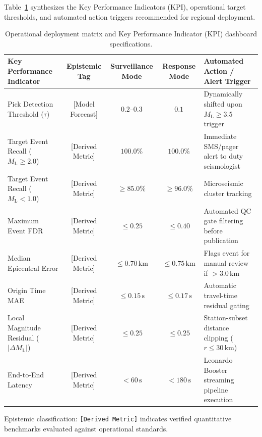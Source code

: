 Table~\ref{tab:operational_kpi_matrix} synthesizes the Key Performance Indicators (\ac{KPI}), operational target thresholds, and automated action triggers recommended for regional deployment.

\begin{table}[htbp]
  \centering
  \small
  \caption{Operational deployment matrix and Key Performance Indicator (KPI) dashboard specifications.}
  \label{tab:operational_kpi_matrix}
  \begin{threeparttable}
    \begin{tabularx}{\linewidth}{l c c c X}
      \toprule
      \textbf{Key Performance Indicator} & \textbf{Epistemic Tag\tnote{a}} & \textbf{Surveillance Mode} & \textbf{Response Mode} & \textbf{Automated Action / Alert Trigger} \\
      \midrule
      Pick Detection Threshold ($\tau$) & [Model Forecast] & $0.2\text{--}0.3$ & $0.1$ & Dynamically shifted upon $M_{\mathrm{L}} \ge 3.5$ trigger \\
      Target Event Recall ($M_{\mathrm{L}} \ge 2.0$) & [Derived Metric] & $100.0\%$ & $100.0\%$ & Immediate SMS/pager alert to duty seismologist \\
      Target Event Recall ($M_{\mathrm{L}} < 1.0$) & [Derived Metric] & $\ge 85.0\%$ & $\ge 96.0\%$ & Microseismic cluster tracking \\
      Maximum Event FDR & [Derived Metric] & $\le 0.25$ & $\le 0.40$\tnote{b} & Automated QC gate filtering before publication \\
      Median Epicentral Error & [Derived Metric] & $\le 0.70\,\unit{\kilo\meter}$ & $\le 0.75\,\unit{\kilo\meter}$ & Flags event for manual review if $> 3.0\,\unit{\kilo\meter}$ \\
      Origin Time MAE & [Derived Metric] & $\le 0.15\,\unit{\second}$ & $\le 0.17\,\unit{\second}$ & Automatic travel-time residual gating \\
      Local Magnitude Residual ($|\Delta M_{\mathrm{L}}|$) & [Derived Metric] & $\le 0.25$ & $\le 0.25$ & Station-subset distance clipping ($r \le 30\,\unit{\kilo\meter}$) \\
      End-to-End Latency & [Derived Metric] & $< 60\,\unit{\second}$ & $< 180\,\unit{\second}$ & Leonardo Booster streaming pipeline execution \\
      \bottomrule
    \end{tabularx}
    \begin{tablenotes}[flushleft]
      \footnotesize
      \item[a] Epistemic classification: \texttt{[Derived Metric]} indicates verified quantitative benchmarks evaluated against operational standards.

\end{tablenotes}
\end{threeparttable}
\end{table}
